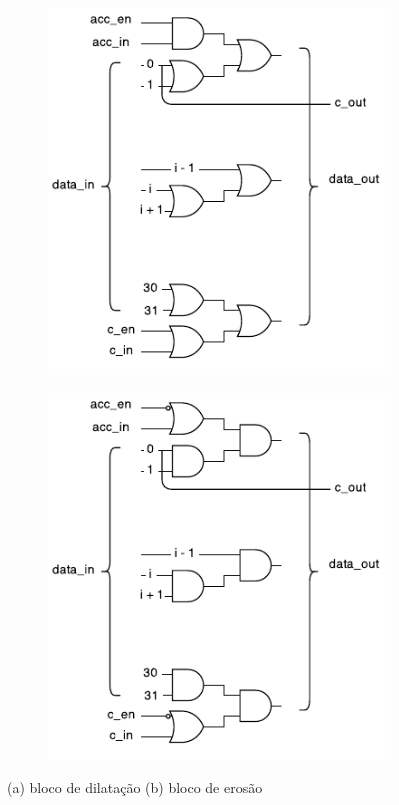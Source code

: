 \documentclass[a4paper]{article}
\begin{document}
\begin{figure}[h]
	\centering
	\begin{subfigure}[b]{0.45\textwidth}
		\centering
		\includegraphics[width=\linewidth]{HALF_D_block}
		\caption{}
		\label{fig:HALF_D_block}
	\end{subfigure}
	\begin{subfigure}[b]{0.45\textwidth}
		\centering
		\includegraphics[width=\linewidth]{HALF_E_block}
		\caption{}
		\label{fig:HALF_E_block}
	\end{subfigure}
	\caption{(a) bloco de dilatação (b) bloco de erosão}
	\label{fig:HALF_E_D_blocks}
\end{figure}
\end{document}
